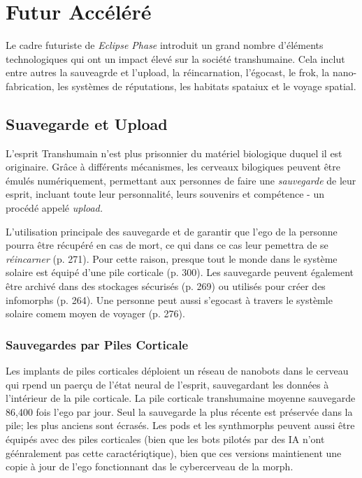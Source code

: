 



\chapter{Futur Accéléré} \label{cha:accelerated-future} 



















Le cadre futuriste de \textit{Eclipse Phase} introduit un grand nombre d'éléments technologiques qui ont un impact élevé sur la société transhumaine. Cela inclut entre autres la sauveagrde et l'upload, la réincarnation, l'égocast, le frok, la nano-fabrication, les systèmes de réputations, les habitats spataiux et le voyage spatial. 

\section{Suavegarde et Upload} 

L'esprit Transhumain n'est plus prisonnier du matériel biologique duquel il est originaire. Grâce à différents mécanismes, les cerveaux bilogiques peuvent être émulés numériquement, permettant aux personnes de faire une \textit{sauvegarde} de leur esprit, incluant toute leur personnalité, leurs souvenirs et compétence - un procédé appelé \textit{upload.} 

L'utilisation principale des sauvegarde et de garantir que l'ego de la personne pourra être récupéré en cas de mort, ce qui dans ce cas leur pemettra de se \textit{réincarner} (p. 271). Pour cette raison, presque tout le monde dans le système solaire est équipé d'une pile corticale (p. 300). Les sauvegarde peuvent également être archivé dans des stockages sécurisés (p. 269) ou utilisés pour créer des infomorphs (p. 264). Une personne peut aussi s'egocast à travers le systèmle solaire comem moyen de voyager (p. 276). 

\subsection{Sauvegardes par Piles Corticale} 

Les implants de piles corticales déploient un réseau de nanobots dans le cerveau qui rpend un paerçu de l'état neural de l'esprit, sauvegardant les données à l'intérieur de la pile corticale. La pile corticale transhumaine moyenne sauvegarde 86,400 fois l'ego par jour. Seul la sauvegarde la plus récente est préservée dans la pile; les plus anciens sont écrasés. Les pods et les synthmorphs peuvent aussi être équipés avec des piles corticales (bien que les bots pilotés par des IA n'ont géénralement pas cette caractériqtique), bien que ces versions maintienent une copie à jour de l'ego fonctionnant das le cybercerveau de la morph. 

